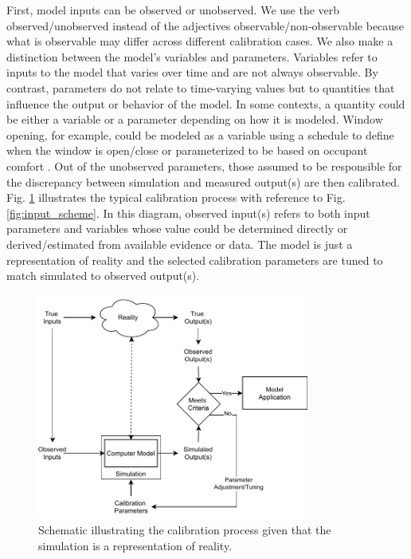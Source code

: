 \documentclass[review]{elsarticle}
\begin{document}
First, model inputs can be observed or unobserved. We use the verb observed/unobserved instead of the adjectives observable/non-observable because what is observable may differ across different calibration cases. We also make a distinction between the model's variables and parameters. Variables refer to inputs to the model that varies over time and are not always observable. By contrast, parameters do not relate to time-varying values but to quantities that influence the output or behavior of the model. In some contexts, a quantity could be either a variable or a parameter depending on how it is modeled. Window opening, for example, could be modeled as a variable using a schedule to define when the window is open/close or parameterized to be based on occupant comfort \cite{gunay2016implementation}. Out of the unobserved parameters, those assumed to be responsible for the discrepancy between simulation and measured output(s) are then calibrated. Fig. \ref{fig:morphism} illustrates the typical calibration process with reference to Fig. \ref{fig:input_scheme}. In this diagram, observed input(s) refers to both input parameters and variables whose value could be determined directly or derived/estimated from available evidence or data. The model is just a representation of reality and the selected calibration parameters are tuned to match simulated to observed output(s).

\begin{figure}[!h]
\centering
\includegraphics[width=0.8\textwidth]{figures/morphism.pdf}
\caption{Schematic illustrating the calibration process given that the simulation is a representation of reality.}
\label{fig:morphism}
\end{figure}
\end{document}
